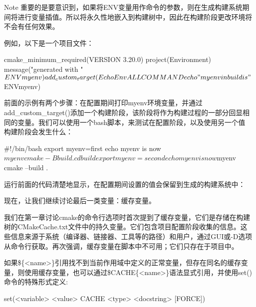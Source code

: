 \begin{myNotic}{Note}
重要的是要意识到，如果将ENV变量用作命令的参数，则在生成构建系统期间将进行变量插值。所以将永久性地嵌入到构建树中，因此在构建阶段更改环境将不会有任何效果。
\end{myNotic}

例如，以下是一个项目文件：


\begin{cmake}
cmake_minimum_required(VERSION 3.20.0)
project(Environment)
message("generated with " $ENV{myenv})
add_custom_target(EchoEnv ALL COMMAND echo "myenv in build
  is" $ENV{myenv})
\end{cmake}

前面的示例有两个步骤：在配置期间打印myenv环境变量，并通过add\_custom\_target()添加一个构建阶段，该阶段将作为构建过程的一部分回显相同的变量。我们可以使用一个bash脚本，来测试在配置阶段，以及使用另一个值构建阶段会发生什么：


\begin{shell}
#!/bin/bash
export myenv=first
echo myenv is now $myenv
cmake -B build .
cd build
export myenv=second
echo myenv is now $myenv
cmake --build .
\end{shell}

运行前面的代码清楚地显示，在配置期间设置的值会保留到生成的构建系统中：


现在，让我们继续讨论最后一类变量：缓存变量。


我们在第一章讨论cmake的命令行选项时首次提到了缓存变量，它们是存储在构建树的CMakeCache.txt文件中的持久变量。它们包含项目配置阶段收集的信息。这些信息来源于系统（编译器、链接器、工具等的路径）和用户，通过GUI或-D选项从命令行获取。再次强调，缓存变量在脚本中不可用；它们只存在于项目中。

如果\$\{<name>\}引用找不到当前作用域中定义的正常变量，但存在同名的缓存变量，则使用缓存变量，也可以通过\$CACHE\{<name>\}语法显式引用，并使用set()命令的特殊形式定义:

\begin{cmake}
set(<variable> <value> CACHE <type> <docstring> [FORCE])
\end{cmake}

